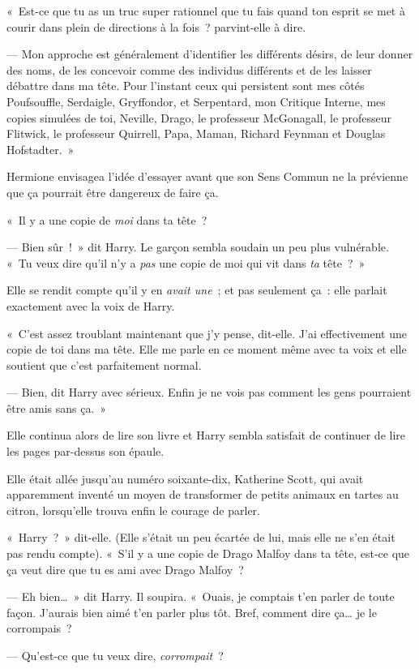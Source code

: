«~Est-ce que tu as un truc super rationnel que tu fais quand ton esprit se met à courir dans plein de directions à la fois~? parvint-elle à dire.

--- Mon approche est généralement d'identifier les différents désirs, de leur donner des noms, de les concevoir comme des individus différents et de les laisser débattre dans ma tête. Pour l'instant ceux qui persistent sont mes côtés Poufsouffle, Serdaigle, Gryffondor, et Serpentard, mon Critique Interne, mes copies simulées de toi, Neville, Drago, le professeur McGonagall, le professeur Flitwick, le professeur Quirrell, Papa, Maman, Richard Feynman et Douglas Hofstadter.~»

Hermione envisagea l'idée d'essayer avant que son Sens Commun ne la prévienne que ça pourrait être dangereux de faire ça.

«~Il y a une copie de \emph{moi} dans ta tête~?

--- Bien sûr~!~» dit Harry. Le garçon sembla soudain un peu plus vulnérable. «~Tu veux dire qu'il n'y a \emph{pas} une copie de moi qui vit dans \emph{ta} tête~?~»

Elle se rendit compte qu'il y en \emph{avait une}~; et pas seulement ça~: elle parlait exactement avec la voix de Harry.

«~C'est assez troublant maintenant que j'y pense, dit-elle. J'ai effectivement une copie de toi dans ma tête. Elle me parle en ce moment même avec ta voix et elle soutient que c'est parfaitement normal.

--- Bien, dit Harry avec sérieux. Enfin je ne vois pas comment les gens pourraient être amis sans ça.~»

Elle continua alors de lire son livre et Harry sembla satisfait de continuer de lire les pages par-dessus son épaule.

Elle était allée jusqu'au numéro soixante-dix, Katherine Scott, qui avait apparemment inventé un moyen de transformer de petits animaux en tartes au citron, lorsqu'elle trouva enfin le courage de parler.

«~Harry~?~» dit-elle. (Elle s'était un peu écartée de lui, mais elle ne s'en était pas rendu compte). «~S'il y a une copie de Drago Malfoy dans ta tête, est-ce que ça veut dire que tu es ami avec Drago Malfoy~?

--- Eh bien…~» dit Harry. Il soupira. «~Ouais, je comptais t'en parler de toute façon. J'aurais bien aimé t'en parler plus tôt. Bref, comment dire ça… je le corrompais~?

--- Qu'est-ce que tu veux dire, \emph{corrompait}~?

